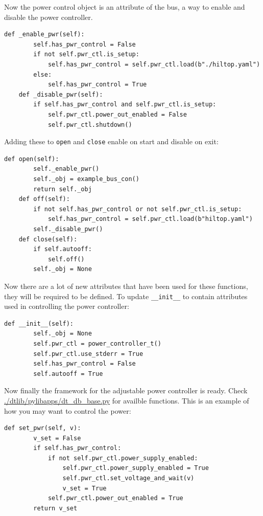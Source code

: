 \documentclass[a4paper,12pt, notitlepage]{article}
\begin{document}
Now the power control object is an attribute of the bus, a way to enable and disable the power controller. 

\begin{lstlisting}[label={lst: adjpwrStruct1},caption={}]
    def _enable_pwr(self):
        self.has_pwr_control = False
        if not self.pwr_ctl.is_setup:
            self.has_pwr_control = self.pwr_ctl.load(b"./hiltop.yaml")
        else:
            self.has_pwr_control = True
    def _disable_pwr(self):
        if self.has_pwr_control and self.pwr_ctl.is_setup:
            self.pwr_ctl.power_out_enabled = False
            self.pwr_ctl.shutdown()
\end{lstlisting}

Adding these to \lstinline!open! and \lstinline!close! enable on start and disable on exit:

\begin{lstlisting}[label={lst: adjpwrStruct2},caption={Enabling power supply for the duration of the test groups.}]
    def open(self):
        self._enable_pwr()
        self._obj = example_bus_con()
        return self._obj
    def off(self):
        if not self.has_pwr_control or not self.pwr_ctl.is_setup:
            self.has_pwr_control = self.pwr_ctl.load(b"hiltop.yaml")
        self._disable_pwr()
    def close(self):
        if self.autooff:
            self.off()
        self._obj = None
\end{lstlisting}

Now there are a lot of new attributes that have been used for these functions, they will be required to be defined. To update \lstinline!__init__! to contain attributes used in controlling the power controller:

\begin{lstlisting}[label={lst: adjpwrStruct3},caption={Including new attributes.}]
    def __init__(self):
        self._obj = None
        self.pwr_ctl = power_controller_t()
        self.pwr_ctl.use_stderr = True
        self.has_pwr_control = False
        self.autooff = True
\end{lstlisting}

Now finally the framework for the adjustable power controller is ready. Check \url{./dtlib/pylibapps/dt_db_base.py} for availble functions. This is an example of how you may want to control the power:

\begin{lstlisting}[label={lst: adjpwrStruct4},caption={Function for setting power and waiting.}]
    def set_pwr(self, v):
        v_set = False
        if self.has_pwr_control:
            if not self.pwr_ctl.power_supply_enabled:
                self.pwr_ctl.power_supply_enabled = True
                self.pwr_ctl.set_voltage_and_wait(v)
                v_set = True
            self.pwr_ctl.power_out_enabled = True
        return v_set
\end{lstlisting}
\end{document}
